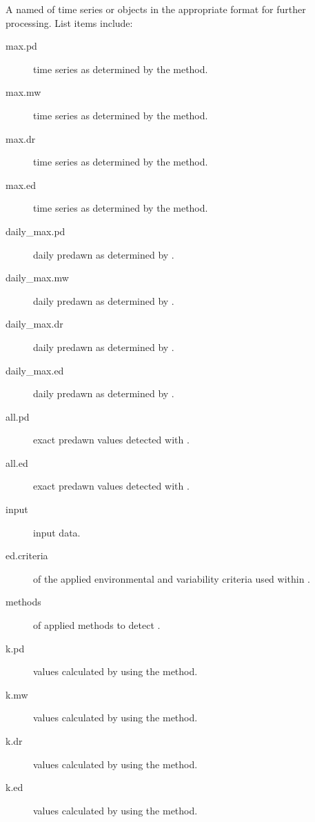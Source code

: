 \documentclass[a4paper]{book}
\begin{document}
%
\begin{Value}
A named  of  time series or 
objects in the appropriate format for further processing.
List items include:
\begin{description}

\item[max.pd]  time series as determined by the  method.
\item[max.mw]  time series as determined by the  method.
\item[max.dr]  time series as determined by the  method.
\item[max.ed]  time series as determined by the  method.
\item[daily\_max.pd] daily predawn  as determined by .
\item[daily\_max.mw] daily predawn  as determined by .
\item[daily\_max.dr] daily predawn  as determined by .
\item[daily\_max.ed] daily predawn  as determined by .
\item[all.pd] exact predawn  values detected with .
\item[all.ed] exact predawn  values detected with .
\item[input]  input data.
\item[ed.criteria]  of the applied environmental and variability criteria used within .
\item[methods]  of applied methods to detect .
\item[k.pd]  values calculated by using the  method.
\item[k.mw]  values calculated by using the  method.
\item[k.dr]  values calculated by using the  method.
\item[k.ed]  values calculated by using the  method.

\end{description}

\end{Value}
%
\end{document}
